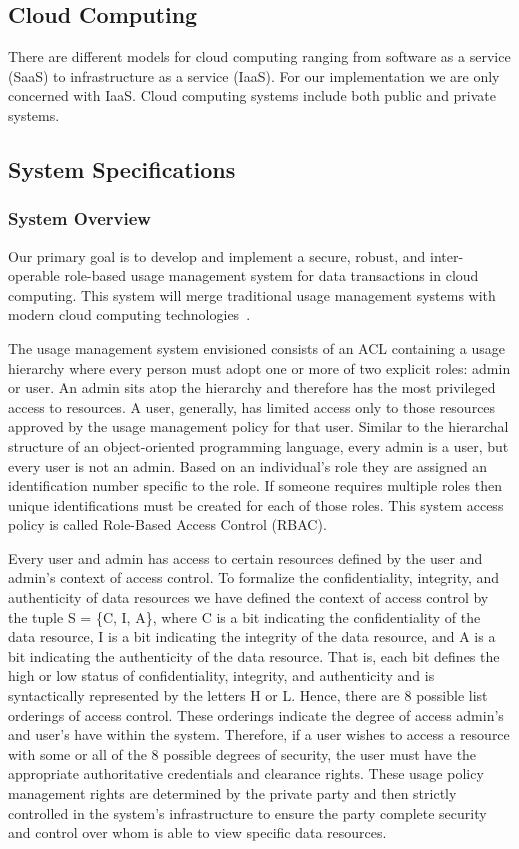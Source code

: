 \documentclass{acm_proc_article-sp}
\begin{document}
\subsection{Cloud Computing}
There are different models for cloud computing ranging from software as a service (SaaS) to infrastructure as a service (IaaS). For our implementation we are only concerned with IaaS. Cloud computing systems include both public and private systems. 

\subsection{System Specifications}
\subsubsection{System Overview}
Our primary goal is to develop and implement a secure, robust, and inter-operable role-based usage management system for data transactions in cloud computing. This system will merge traditional usage management systems with modern cloud computing technologies~\cite{Jamkhedkar:2010:IUM:1866870.1866885}.

The usage management system envisioned consists of an ACL containing a usage hierarchy where every person must adopt one or more of two explicit roles: admin or user. An admin sits atop the hierarchy and therefore has the most privileged access to resources. A user, generally, has limited access only to those resources approved by the usage management policy for that user. Similar to the hierarchal structure of an object-oriented programming language, every admin is a user, but every user is not an admin. Based on an individual's role they are assigned an identification number specific to the role. If someone requires multiple roles then unique identifications must be created for each of those roles. This system access policy is called Role-Based Access Control (RBAC). 

Every user and admin has access to certain resources defined by the user and admin's context of access control.  To formalize the confidentiality, integrity, and authenticity of data resources we have defined the context of access control by the tuple S = \{C, I, A\}, where C is a bit indicating the confidentiality of the data resource, I is a bit indicating the integrity of the data resource, and A is a bit indicating the authenticity of the data resource. That is, each bit defines the high or low status of confidentiality, integrity, and authenticity and is syntactically represented by the letters H or L.  Hence, there are 8 possible list orderings of access control.  These orderings indicate the degree of access admin's and user's have within the system. Therefore, if a user wishes to access a resource with some or all of the 8 possible degrees of security, the user must have the appropriate authoritative credentials and clearance rights.  These usage policy management rights are determined by the private party and then strictly controlled in the system's infrastructure to ensure the party complete security and control over whom is able to view specific data resources.
\end{document}
